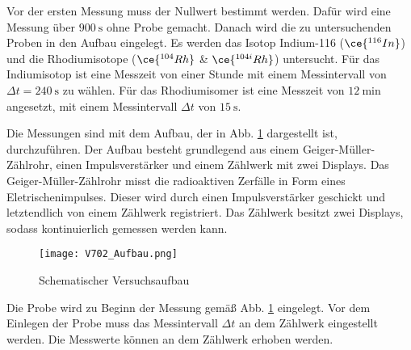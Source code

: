 Vor der ersten Messung muss der Nullwert bestimmt werden. Dafür wird eine
Messung über $\SI{900}{\second}$ ohne Probe gemacht.
Danach wird die zu untersuchenden Proben in den Aufbau eingelegt.
Es werden das Isotop Indium-116 ($\ce{^{116}In}$)
und die Rhodiumisotope ($\ce{^{104}Rh}$ \& $\ce{^{104i}Rh}$) untersucht.
Für das Indiumisotop ist eine Messzeit von einer Stunde mit einem Messintervall von
$\Delta t = \SI{240}{\second}$ zu wählen. Für das Rhodiumisomer ist eine
Messzeit von $\SI{12}{\minute}$ angesetzt, mit einem Messintervall
$\Delta t$ von $\SI{15}{\second}$.

Die Messungen sind mit dem Aufbau, der in Abb. \ref{fig:Aufbau} dargestellt ist,
durchzuführen. Der Aufbau besteht grundlegend aus einem Geiger-Müller-Zählrohr,
einen Impulsverstärker und einem Zählwerk mit zwei Displays.
Das Geiger-Müller-Zählrohr misst die radioaktiven Zerfälle in Form
eines Eletrischenimpulses. Dieser wird durch einen Impulsverstärker geschickt und
letztendlich von einem Zählwerk registriert. Das Zählwerk besitzt zwei Displays,
sodass kontinuierlich gemessen werden kann.

\begin{figure}
  \centering
  \texttt{[image: V702\_Aufbau.png]}
  \caption{Schematischer Versuchsaufbau\cite{anleitung01}}
  \label{fig:Aufbau}
\end{figure}

Die Probe wird zu Beginn der Messung gemäß Abb. \ref{fig:Aufbau} eingelegt.
Vor dem Einlegen der Probe muss das Messintervall $\Delta t$ an dem Zählwerk
eingestellt werden. Die Messwerte können an dem Zählwerk erhoben werden.

\newpage



\printbibliography


